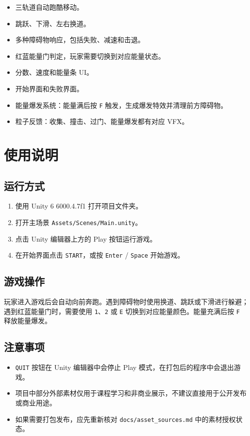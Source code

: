 \documentclass[UTF8,a4paper,12pt]{ctexart}
\begin{document}
\begin{itemize}
  \item 三轨道自动跑酷移动。
  \item 跳跃、下滑、左右换道。
  \item 多种障碍物响应，包括失败、减速和击退。
  \item 红蓝能量门判定，玩家需要切换到对应能量状态。
  \item 分数、速度和能量条 UI。
  \item 开始界面和失败界面。
  \item 能量爆发系统：能量满后按 \texttt{F} 触发，生成爆发特效并清理前方障碍物。
  \item 粒子反馈：收集、撞击、过门、能量爆发都有对应 VFX。
\end{itemize}

\section{使用说明}

\subsection{运行方式}

\begin{enumerate}
  \item 使用 Unity 6 6000.4.7f1 打开项目文件夹。
  \item 打开主场景 \texttt{Assets/Scenes/Main.unity}。
  \item 点击 Unity 编辑器上方的 Play 按钮运行游戏。
  \item 在开始界面点击 \texttt{START}，或按 \texttt{Enter} / \texttt{Space} 开始游戏。
\end{enumerate}

\subsection{游戏操作}

玩家进入游戏后会自动向前奔跑。遇到障碍物时使用换道、跳跃或下滑进行躲避；遇到红蓝能量门时，需要使用 \texttt{1}、\texttt{2} 或 \texttt{E} 切换到对应能量颜色。能量充满后按 \texttt{F} 释放能量爆发。

\subsection{注意事项}

\begin{itemize}
  \item \texttt{QUIT} 按钮在 Unity 编辑器中会停止 Play 模式，在打包后的程序中会退出游戏。
  \item 项目中部分外部素材仅用于课程学习和非商业展示，不建议直接用于公开发布或商业用途。
  \item 如果需要打包发布，应先重新核对 \texttt{docs/asset\_sources.md} 中的素材授权状态。
\end{itemize}
\end{document}
